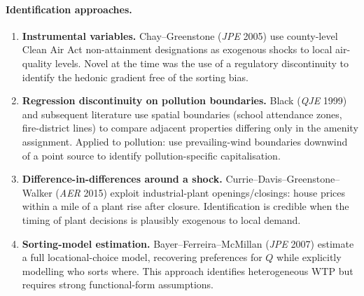 \documentclass[11pt,a4paper]{article}
\begin{document}
\paragraph{Identification approaches.}
\begin{enumerate}[leftmargin=*,itemsep=2pt]
    \item \textbf{Instrumental variables.} Chay--Greenstone (\emph{JPE} 2005) use county-level Clean Air Act non-attainment designations as exogenous shocks to local air-quality levels. Novel at the time was the use of a regulatory discontinuity to identify the hedonic gradient free of the sorting bias.
    \item \textbf{Regression discontinuity on pollution boundaries.} Black (\emph{QJE} 1999) and subsequent literature use spatial boundaries (school attendance zones, fire-district lines) to compare adjacent properties differing only in the amenity assignment. Applied to pollution: use prevailing-wind boundaries downwind of a point source to identify pollution-specific capitalisation.
    \item \textbf{Difference-in-differences around a shock.} Currie--Davis--Greenstone--Walker (\emph{AER} 2015) exploit industrial-plant openings/closings: house prices within a mile of a plant rise after closure. Identification is credible when the timing of plant decisions is plausibly exogenous to local demand.
    \item \textbf{Sorting-model estimation.} Bayer--Ferreira--McMillan (\emph{JPE} 2007) estimate a full locational-choice model, recovering preferences for $Q$ while explicitly modelling who sorts where. This approach identifies heterogeneous WTP but requires strong functional-form assumptions.
\end{enumerate}
\end{document}
